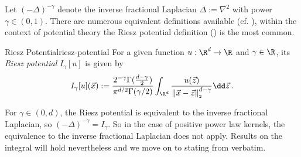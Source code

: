 Let $(-\Delta)^{-\gamma}$ denote the inverse fractional Laplacian $\Delta := \nabla^2$ with power $\gamma \in (0, 1)$.
There are numerous equivalent definitions available (cf. \cite{2015-fractional-laplacian-definitions}), within the context of potential theory the Riesz potential definition () is the most common.

\begin{definition}{Riesz Potential}{riesz-potential}
  For a given function $u: \R^d \to \R$ and $\gamma \in \R$, its \textit{Riesz potential} $I_{\gamma}[u]$ is given by
  $$I_{\gamma}[u](\vec{x}) := \frac{2^{-\gamma} \Gamma(\tfrac{d-\gamma}{2})}{\pi^{d/2} \Gamma(\gamma/2)} \int_{\R^d} \frac{u(\vec{z})}{\norm{\vec{x}-\vec{z}}^{d-\gamma}} \dd\vec{z}\,.$$
\end{definition}

For $\gamma \in (0, d)$, the Riesz potential is equivalent to the inverse fractional Laplacian, so $(-\Delta)^{-\gamma} = I_\gamma$.
So in the case of positive power law kernels, the equivalence to the inverse fractional Laplacian does not apply.
Results on the integral will hold nevertheless and we move on to stating  from \cite{2021-arbitrary-dimensions} verbatim.
